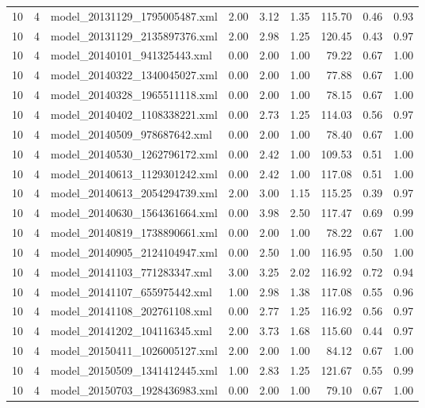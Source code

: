 \begin{table}[ht]
\begin{tabular}{rrlrrrrrr}
   10 &   4 & model\_20131129\_1795005487.xml & 2.00 & 3.12 & 1.35 & 115.70 & 0.46 & 0.93 \\ 
   10 &   4 & model\_20131129\_2135897376.xml & 2.00 & 2.98 & 1.25 & 120.45 & 0.43 & 0.97 \\ 
   10 &   4 & model\_20140101\_941325443.xml & 0.00 & 2.00 & 1.00 & 79.22 & 0.67 & 1.00 \\ 
   10 &   4 & model\_20140322\_1340045027.xml & 0.00 & 2.00 & 1.00 & 77.88 & 0.67 & 1.00 \\ 
   10 &   4 & model\_20140328\_1965511118.xml & 0.00 & 2.00 & 1.00 & 78.15 & 0.67 & 1.00 \\ 
   10 &   4 & model\_20140402\_1108338221.xml & 0.00 & 2.73 & 1.25 & 114.03 & 0.56 & 0.97 \\ 
   10 &   4 & model\_20140509\_978687642.xml & 0.00 & 2.00 & 1.00 & 78.40 & 0.67 & 1.00 \\ 
   10 &   4 & model\_20140530\_1262796172.xml & 0.00 & 2.42 & 1.00 & 109.53 & 0.51 & 1.00 \\ 
   10 &   4 & model\_20140613\_1129301242.xml & 0.00 & 2.42 & 1.00 & 117.08 & 0.51 & 1.00 \\ 
   10 &   4 & model\_20140613\_2054294739.xml & 2.00 & 3.00 & 1.15 & 115.25 & 0.39 & 0.97 \\ 
   10 &   4 & model\_20140630\_1564361664.xml & 0.00 & 3.98 & 2.50 & 117.47 & 0.69 & 0.99 \\ 
   10 &   4 & model\_20140819\_1738890661.xml & 0.00 & 2.00 & 1.00 & 78.22 & 0.67 & 1.00 \\ 
   10 &   4 & model\_20140905\_2124104947.xml & 0.00 & 2.50 & 1.00 & 116.95 & 0.50 & 1.00 \\ 
   10 &   4 & model\_20141103\_771283347.xml & 3.00 & 3.25 & 2.02 & 116.92 & 0.72 & 0.94 \\ 
   10 &   4 & model\_20141107\_655975442.xml & 1.00 & 2.98 & 1.38 & 117.08 & 0.55 & 0.96 \\ 
   10 &   4 & model\_20141108\_202761108.xml & 0.00 & 2.77 & 1.25 & 116.92 & 0.56 & 0.97 \\ 
   10 &   4 & model\_20141202\_104116345.xml & 2.00 & 3.73 & 1.68 & 115.60 & 0.44 & 0.97 \\ 
   10 &   4 & model\_20150411\_1026005127.xml & 2.00 & 2.00 & 1.00 & 84.12 & 0.67 & 1.00 \\ 
   10 &   4 & model\_20150509\_1341412445.xml & 1.00 & 2.83 & 1.25 & 121.67 & 0.55 & 0.99 \\ 
   10 &   4 & model\_20150703\_1928436983.xml & 0.00 & 2.00 & 1.00 & 79.10 & 0.67 & 1.00 \\ 

\end{tabular}
\end{table}
